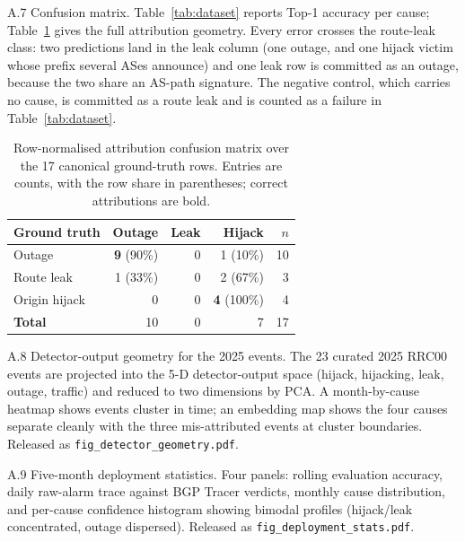 A.7 Confusion matrix.  Table~\ref{tab:dataset} reports Top-1 accuracy
per cause; Table~\ref{tab:confusion} gives the full attribution
geometry.  Every error crosses the route-leak class: two
predictions land in the leak column (one outage, and one hijack
victim whose prefix several ASes announce) and one leak row is
committed as an outage, because the two share an AS-path
signature.  The negative control, which carries no cause, is
committed as a route leak and is counted as a failure in
Table~\ref{tab:dataset}.

\begin{table}[!htbp]
\centering
\caption{Row-normalised attribution confusion matrix over the 17
canonical ground-truth rows.  Entries are counts, with the row share in
parentheses; correct attributions are bold.}
\label{tab:confusion}
\small
\begin{tabular}{@{}l r r r r@{}}
\hline
\textbf{Ground truth} & \textbf{Outage} & \textbf{Leak} & \textbf{Hijack} & \textbf{$n$} \\
\hline
Outage               & \textbf{9} (90\%)  & 0                 & 1 (10\%)           & 10 \\
Route leak           & 1 (33\%)          & 0                 & 2 (67\%)           &  3 \\
Origin hijack        & 0                 & 0                 & \textbf{4} (100\%) &  4 \\
\hline
\textbf{Total}     & 10                & 0                 & 7                 & 17 \\
\hline
\end{tabular}
\end{table}

A.8 Detector-output geometry for the 2025 events.
The 23 curated 2025 RRC00 events are projected into
the 5-D detector-output space (hijack, hijacking,
leak, outage, traffic) and reduced to two dimensions
by PCA. A month-by-cause heatmap shows events cluster
in time; an embedding map shows the four causes
separate cleanly with the three mis-attributed events
at cluster boundaries. Released as
\texttt{fig\_detector\_geometry.pdf}.
\label{app:case-geo}

A.9 Five-month deployment statistics.  Four panels:
rolling evaluation accuracy, daily raw-alarm trace
against BGP Tracer verdicts, monthly cause
distribution, and per-cause confidence histogram
showing bimodal profiles (hijack/leak concentrated,
outage dispersed). Released as
\texttt{fig\_deployment\_stats.pdf}.
\label{app:deployment}


